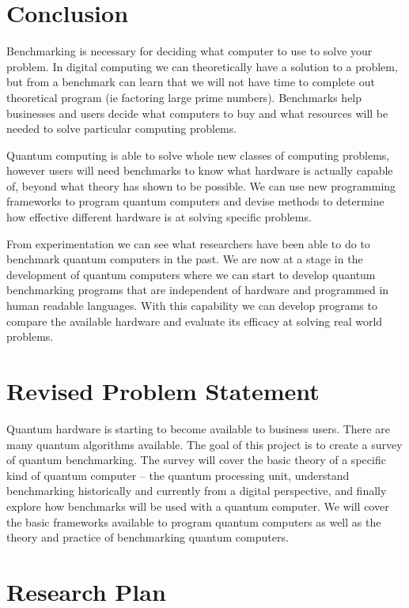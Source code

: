 \documentclass{article}
\begin{document}
\section{Conclusion}

Benchmarking is necessary for deciding what computer to use to solve your problem. In digital computing we can theoretically have a solution to a problem, but from a benchmark can learn that we will not have time to complete out theoretical program (ie factoring large prime numbers). Benchmarks help businesses and users decide what computers to buy and what resources will be needed to solve particular computing problems. 

Quantum computing is able to solve whole new classes of computing problems, however users will need benchmarks to know what hardware is actually capable of, beyond what theory has shown to be possible. We can use new programming frameworks to program quantum computers and devise methods to determine how effective different hardware is at solving specific problems. 

From experimentation we can see what researchers have been able to do to benchmark quantum computers in the past. We are now at a stage in the development of quantum computers where we can start to develop quantum benchmarking programs that are independent of hardware and programmed in human readable languages. With this capability we can develop programs to compare the available hardware and evaluate its efficacy at solving real world problems.


\section{Revised Problem Statement}
Quantum hardware is starting to become available to business users. There are many quantum algorithms available. The goal of this project is to create a survey of quantum benchmarking. The survey will cover the basic theory of a specific kind of quantum computer -- the quantum processing unit, understand benchmarking historically and currently from a digital perspective, and finally explore how benchmarks will be used with a quantum computer. We will cover the basic frameworks available to program quantum computers as well as the theory and practice of benchmarking quantum computers.
 
\section{Research Plan}
\end{document}
